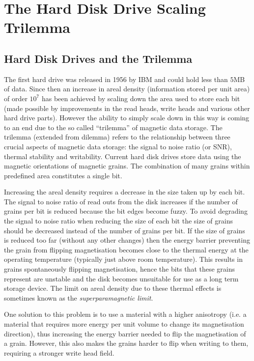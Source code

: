 \section{The Hard Disk Drive Scaling Trilemma}
\label{sec:trilemma}

\subsection{Hard Disk Drives and the Trilemma}
\label{sec:hard-disk-drives}

The first hard drive was released in 1956 by IBM and could hold less than $5$MB of data. Since then an increase in areal density (information stored per unit area) of order $10^{7}$ has been achieved by scaling down the area used to store each bit (made possible by improvements in the read heads, write heads and various other hard drive parts)\cite{Stefanita2008}. However the ability to simply scale down in this way is coming to an end due to the so called ``trilemma'' of magnetic data storage\cite{Chan2010}. The trilemma (extended from dilemma) refers to the relationship between three crucial aspects of magnetic data storage: the signal to noise ratio (or SNR), thermal stability and writability. Current hard disk drives store data using the magnetic orientations of magnetic grains. The combination of many grains within predefined area constitutes a single bit.

Increasing the areal density requires a decrease in the size taken up by each bit. The signal to noise ratio of read outs from the disk increases if the number of grains per bit is reduced because the bit edges become fuzzy. To avoid degrading the signal to noise ratio when reducing the size of each bit the size of grains should be decreased instead of the number of grains per bit.\cite{McDaniel2005} If the size of grains is reduced too far (without any other changes) then the energy barrier preventing the grain from flipping magnetisation becomes close to the thermal energy at the operating temperature (typically just above room temperature). This results in grains spontaneously flipping magnetisation, hence the bits that these grains represent are unstable and the disk becomes unsuitable for use as a long term storage device. The limit on areal density due to these thermal effects is sometimes known as the \emph{superparamagnetic limit}.

One solution to this problem is to use a material with a higher anisotropy (i.e. a material that requires more energy per unit volume to change its magnetisation direction), thus increasing the energy barrier needed to flip the magnetisation of a grain. However, this also makes the grains harder to flip when writing to them, requiring a stronger write head field.

